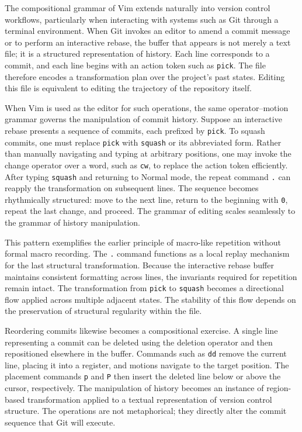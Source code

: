 \documentclass[12pt]{article}
\begin{document}
The compositional grammar of Vim extends naturally into version control workflows, particularly when interacting with systems such as Git through a terminal environment. When Git invokes an editor to amend a commit message or to perform an interactive rebase, the buffer that appears is not merely a text file; it is a structured representation of history. Each line corresponds to a commit, and each line begins with an action token such as \texttt{pick}. The file therefore encodes a transformation plan over the project’s past states. Editing this file is equivalent to editing the trajectory of the repository itself.

When Vim is used as the editor for such operations, the same operator–motion grammar governs the manipulation of commit history. Suppose an interactive rebase presents a sequence of commits, each prefixed by \texttt{pick}. To squash commits, one must replace \texttt{pick} with \texttt{squash} or its abbreviated form. Rather than manually navigating and typing at arbitrary positions, one may invoke the change operator over a word, such as \texttt{cw}, to replace the action token efficiently. After typing \texttt{squash} and returning to Normal mode, the repeat command \texttt{.} can reapply the transformation on subsequent lines. The sequence becomes rhythmically structured: move to the next line, return to the beginning with \texttt{0}, repeat the last change, and proceed. The grammar of editing scales seamlessly to the grammar of history manipulation.

This pattern exemplifies the earlier principle of macro-like repetition without formal macro recording. The \texttt{.} command functions as a local replay mechanism for the last structural transformation. Because the interactive rebase buffer maintains consistent formatting across lines, the invariants required for repetition remain intact. The transformation from \texttt{pick} to \texttt{squash} becomes a directional flow applied across multiple adjacent states. The stability of this flow depends on the preservation of structural regularity within the file.

Reordering commits likewise becomes a compositional exercise. A single line representing a commit can be deleted using the deletion operator and then repositioned elsewhere in the buffer. Commands such as \texttt{dd} remove the current line, placing it into a register, and motions navigate to the target position. The placement commands \texttt{p} and \texttt{P} then insert the deleted line below or above the cursor, respectively. The manipulation of history becomes an instance of region-based transformation applied to a textual representation of version control structure. The operations are not metaphorical; they directly alter the commit sequence that Git will execute.
\end{document}
